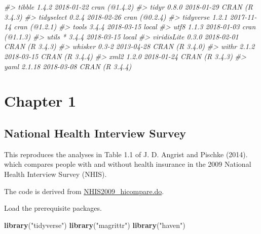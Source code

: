 \documentclass[]{book}
\newenvironment{Shaded}{\begin{snugshade}}{\end{snugshade}}
\newcommand{\KeywordTok}[1]{\textcolor[rgb]{0.13,0.29,0.53}{\textbf{#1}}}
\newcommand{\StringTok}[1]{\textcolor[rgb]{0.31,0.60,0.02}{#1}}
\newcommand{\CommentTok}[1]{\textcolor[rgb]{0.56,0.35,0.01}{\textit{#1}}}
\newcommand{\NormalTok}[1]{#1}
\theoremstyle{definition}
\theoremstyle{definition}
\theoremstyle{definition}
\theoremstyle{remark}
\begin{document}
\begin{Shaded}
\begin{Highlighting}[]
\CommentTok{#>  tibble         1.4.2      2018-01-22 cran (@1.4.2)                   }
\CommentTok{#>  tidyr          0.8.0      2018-01-29 CRAN (R 3.4.3)                  }
\CommentTok{#>  tidyselect     0.2.4      2018-02-26 cran (@0.2.4)                   }
\CommentTok{#>  tidyverse      1.2.1      2017-11-14 cran (@1.2.1)                   }
\CommentTok{#>  tools          3.4.4      2018-03-15 local                           }
\CommentTok{#>  utf8           1.1.3      2018-01-03 cran (@1.1.3)                   }
\CommentTok{#>  utils        * 3.4.4      2018-03-15 local                           }
\CommentTok{#>  viridisLite    0.3.0      2018-02-01 CRAN (R 3.4.3)                  }
\CommentTok{#>  whisker        0.3-2      2013-04-28 CRAN (R 3.4.0)                  }
\CommentTok{#>  withr          2.1.2      2018-03-15 CRAN (R 3.4.4)                  }
\CommentTok{#>  xml2           1.2.0      2018-01-24 CRAN (R 3.4.3)                  }
\CommentTok{#>  yaml           2.1.18     2018-03-08 CRAN (R 3.4.4)}
\end{Highlighting}
\end{Shaded}

\part{Chapter 1}\label{part-chapter-1}

\chapter{National Health Interview
Survey}\label{national-health-interview-survey}

This reproduces the analyses in Table 1.1 of J. D. Angrist and Pischke
(2014). which compares people with and without health insurance in the
2009 National Health Interview Survey (NHIS).

The code is derived from
\href{http://masteringmetrics.com/wp-content/uploads/2015/01/NHIS2009_hicompare.do}{NHIS2009\_hicompare.do}.

Load the prerequisite packages.

\begin{Shaded}
\begin{Highlighting}[]
\KeywordTok{library}\NormalTok{(}\StringTok{"tidyverse"}\NormalTok{)}
\KeywordTok{library}\NormalTok{(}\StringTok{"magrittr"}\NormalTok{)}
\KeywordTok{library}\NormalTok{(}\StringTok{"haven"}\NormalTok{)}
\end{Highlighting}
\end{Shaded}
\end{document}
